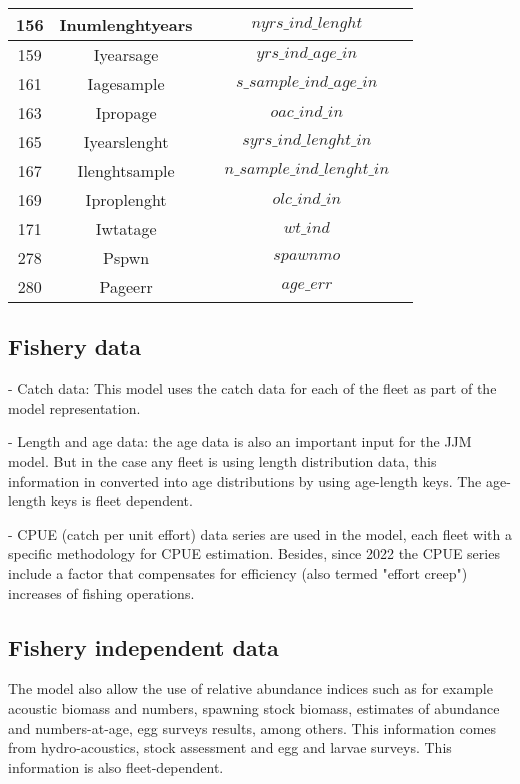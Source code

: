 \documentclass{article}
\begin{document}
\begin{tabular}{| c | c | c | c | c |}
\hline
156 & Inumlenghtyears &   & $nyrs\_ind\_lenght$ & \\ \hline
159 & Iyearsage &   & $yrs\_ind\_age\_in$ & \\ \hline
161 & Iagesample &   & $s\_sample\_ind\_age\_in$ & \\ \hline
163 & Ipropage &   & $oac\_ind\_in$ & \\ \hline
165 & Iyearslenght &   & $syrs\_ind\_lenght\_in$ & \\ \hline
167 & Ilenghtsample &   & $n\_sample\_ind\_lenght\_in$ & \\ \hline
169 & Iproplenght &   & $olc\_ind\_in$ & \\ \hline
171 & Iwtatage &   & $wt\_ind$ & \\ \hline
278 & Pspwn &   & $spawnmo$ & \\ \hline
280 & Pageerr &   & $age\_err$ & \\ \hline
\end{tabular} 

\subsection{Fishery data}

- Catch data: This model uses the catch data for each of the fleet as part of the model representation.

- Length and age data: the age data is also an important input for the JJM model. But in the case any fleet is using length distribution data, this information in converted into age distributions by using age-length keys. The age-length keys is fleet dependent.

- CPUE (catch per unit effort) data series are used in the model, each fleet with a specific methodology for CPUE estimation. Besides, since 2022 the CPUE series include a factor that compensates for efficiency (also termed "effort creep") increases of fishing operations.

\subsection{Fishery independent data}

The model also allow the use of relative abundance indices such as for example acoustic biomass and numbers, spawning stock biomass, estimates of abundance and numbers-at-age, egg surveys results, among others. This information comes from hydro-acoustics, stock assessment and egg and larvae surveys. This information is also fleet-dependent.
\end{document}
